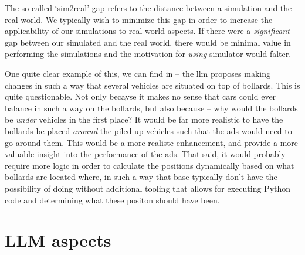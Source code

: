 The so called `sim2real'-gap refers to the distance between a simulation and the real world. We
typically wish to minimize this gap in order to increase the applicability of our simulations to
real world aspects. If there were a \emph{significant} gap between our simulated 
and the real world, there would be minimal value in performing the simulations and the motivation
for \emph{using} simulator would falter.







One quite clear example of this, we can find in
 -- the \acrshort{llm} proposes making changes
in such a way that several vehicles are situated on top of bollards. This is
quite questionable. Not only becayse it makes no sense that cars could ever
balance in such a way on the bollards, but also because -- why would the
bollards be \emph{under} vehicles in the first place? It would be far more
realistic to have the bollards be placed \emph{around} the piled-up vehicles
such that the \acrshort{ads} would need to go around them. This would be a more
realistc enhancement, and provide a more valuable insight into the performance
of the \acrshort{ads}. That said, it would probably require more logic in order
to calculate the positions dynamically based on what bollards are located where,
in such a way that base  typically don't have the possibility of
doing without additional tooling that allows for executing Python code and
determining what these positon should have been.

\section{LLM aspects}


